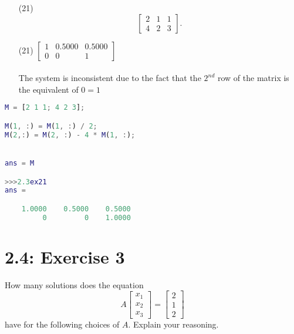 \documentclass{report}
\begin{document}
\begin{enumerate}
    \item[(21)]
\[
\begin{bmatrix}
 2 &  1  &  1   \\
 4 &  2  &  3
\end{bmatrix}.
\]
    
\end{enumerate}

\sol 

\begin{enumerate}
\item[(21)] $\begin{bmatrix}1&0.5000&0.5000 \\ 0&0&1 \end{bmatrix}$ \\
\\
The system is inconsistent due to the fact that the $2^{nd}$ row of the matrix is the equivalent of $0 = 1$
\end{enumerate}

\begin{lstlisting}[language=Matlab, caption={MATLAB code}, xleftmargin=\parindent]
M = [2 1 1; 4 2 3];

M(1, :) = M(1, :) / 2;
M(2,:) = M(2, :) - 4 * M(1, :);


ans = M

>>>2.3ex21
ans =

    1.0000    0.5000    0.5000
         0         0    1.0000

\end{lstlisting}


\section*{2.4: Exercise 3} 

How many solutions does the equation
\[
A \begin{bmatrix} x_1 \\ x_2 \\ x_3 \end{bmatrix} = \begin{bmatrix} 2 \\ 1 \\ 2 \end{bmatrix}
\]
have for the following choices of $A$.  Explain your reasoning.
\end{document}
